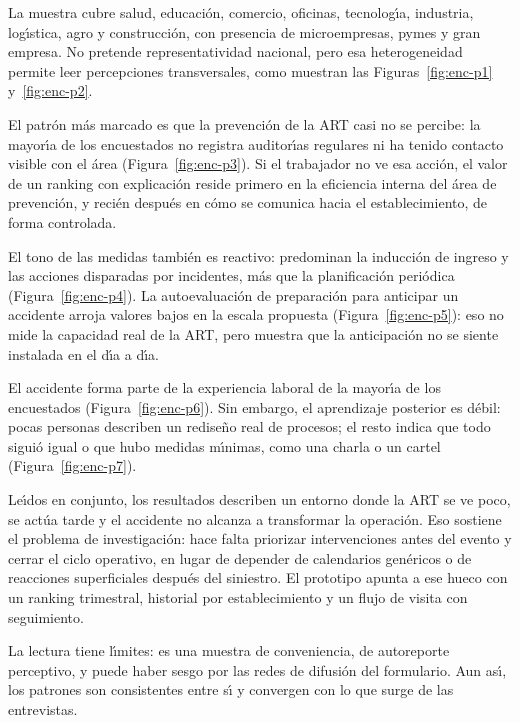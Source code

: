 La muestra cubre salud, educaci\'on, comercio, oficinas, tecnolog\'{\i}a, industria, log\'{\i}stica, agro y construcci\'on, con presencia de microempresas, pymes y gran empresa. No pretende representatividad nacional, pero esa heterogeneidad permite leer percepciones transversales, como muestran las Figuras~\ref{fig:enc-p1} y~\ref{fig:enc-p2}.

El patr\'on m\'as marcado es que la prevenci\'on de la ART casi no se percibe: la mayor\'{\i}a de los encuestados no registra auditor\'{\i}as regulares ni ha tenido contacto visible con el \'area (Figura~\ref{fig:enc-p3}). Si el trabajador no ve esa acci\'on, el valor de un ranking con explicaci\'on reside primero en la eficiencia interna del \'area de prevenci\'on, y reci\'en despu\'es en c\'omo se comunica hacia el establecimiento, de forma controlada.

El tono de las medidas tambi\'en es reactivo: predominan la inducci\'on de ingreso y las acciones disparadas por incidentes, m\'as que la planificaci\'on peri\'odica (Figura~\ref{fig:enc-p4}). La autoevaluaci\'on de preparaci\'on para anticipar un accidente arroja valores bajos en la escala propuesta (Figura~\ref{fig:enc-p5}): eso no mide la capacidad real de la ART, pero muestra que la anticipaci\'on no se siente instalada en el d\'{\i}a a d\'{\i}a.

El accidente forma parte de la experiencia laboral de la mayor\'{\i}a de los encuestados (Figura~\ref{fig:enc-p6}). Sin embargo, el aprendizaje posterior es d\'ebil: pocas personas describen un redise\~no real de procesos; el resto indica que todo sigui\'o igual o que hubo medidas m\'{\i}nimas, como una charla o un cartel (Figura~\ref{fig:enc-p7}).

Le\'{\i}dos en conjunto, los resultados describen un entorno donde la ART se ve poco, se act\'ua tarde y el accidente no alcanza a transformar la operaci\'on. Eso sostiene el problema de investigaci\'on: hace falta priorizar intervenciones antes del evento y cerrar el ciclo operativo, en lugar de depender de calendarios gen\'ericos o de reacciones superficiales despu\'es del siniestro. El prototipo apunta a ese hueco con un ranking trimestral, historial por establecimiento y un flujo de visita con seguimiento.

La lectura tiene l\'{\i}mites: es una muestra de conveniencia, de autoreporte perceptivo, y puede haber sesgo por las redes de difusi\'on del formulario. Aun as\'{\i}, los patrones son consistentes entre s\'{\i} y convergen con lo que surge de las entrevistas.

